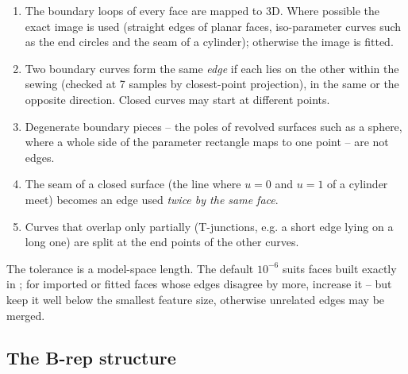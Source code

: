 \begin{enumerate}
\item The boundary loops of every face are mapped to 3D. Where possible the exact image is
used (straight edges of planar faces, iso-parameter curves such as the end circles and the
seam of a cylinder); otherwise the image is fitted.
\item Two boundary curves form the same \emph{edge} if each lies on the other within the
sewing  (checked at 7 samples by closest-point projection), in the same or the
opposite direction. Closed curves may start at different points.
\item Degenerate boundary pieces -- the poles of revolved surfaces such as a sphere, where a
whole side of the parameter rectangle maps to one point -- are not edges.
\item The seam of a closed surface (the line where $u=0$ and $u=1$ of a cylinder meet)
becomes an edge used \emph{twice by the same face}.
\item Curves that overlap only partially (T-junctions, e.g. a short edge lying on a long one)
are split at the end points of the other curves.
\end{enumerate}

The tolerance is a model-space length. The default $10^{-6}$ suits faces built exactly in
\NF{}; for imported or fitted faces whose edges disagree by more, increase it -- but keep it
well below the smallest feature size, otherwise unrelated edges may be merged.

\subsection{The B-rep structure}\label{sec:brep}

